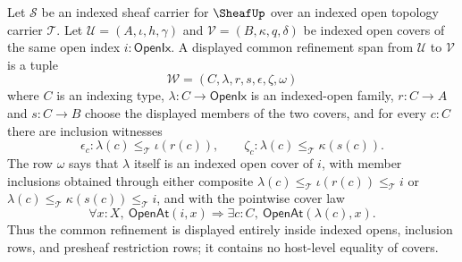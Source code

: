 \begin{definition}
\label{def:sheaf-displayed-common-refinement-span}
Let $\mathcal{S}$ be an indexed sheaf carrier for $\SheafUp$ over an indexed open topology carrier $\mathcal{T}$. Let $\mathcal{U}=(A,\iota,h,\gamma)$ and $\mathcal{V}=(B,\kappa,q,\delta)$ be indexed open covers of the same open index $i:\mathsf{OpenIx}$. A displayed common refinement span from $\mathcal{U}$ to $\mathcal{V}$ is a tuple
$$
\mathcal{W}=(C,\lambda,r,s,\epsilon,\zeta,\omega)
$$
where $C$ is an indexing type, $\lambda:C\to\mathsf{OpenIx}$ is an indexed-open family, $r:C\to A$ and $s:C\to B$ choose the displayed members of the two covers, and for every $c:C$ there are inclusion witnesses
$$
\epsilon_c:\lambda(c)\le_{\mathcal{T}}\iota(r(c)),
\qquad
\zeta_c:\lambda(c)\le_{\mathcal{T}}\kappa(s(c)).
$$
The row $\omega$ says that $\lambda$ itself is an indexed open cover of $i$, with member inclusions obtained through either composite $\lambda(c)\le_{\mathcal{T}}\iota(r(c))\le_{\mathcal{T}}i$ or $\lambda(c)\le_{\mathcal{T}}\kappa(s(c))\le_{\mathcal{T}}i$, and with the pointwise cover law
$$
\forall x:X,\ \mathsf{OpenAt}(i,x)\Longrightarrow\exists c:C,\ \mathsf{OpenAt}(\lambda(c),x).
$$
Thus the common refinement is displayed entirely inside indexed opens, inclusion rows, and presheaf restriction rows; it contains no host-level equality of covers.
\end{definition}

